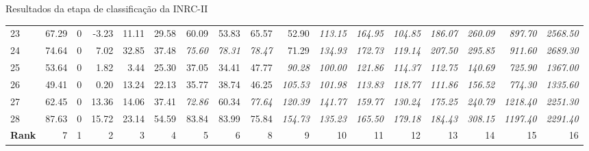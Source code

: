 \documentclass[8pt,mathserif,professionalfont]{beamer}
\begin{document}
\begin{frame}{Resultados da etapa de classificação da INRC-II}
\begin{table}[H]
{\begin{tabular}{lrrrrrrrrrrrrrrrr}
   23 & 67.29 &   0 & -3.23 & 11.11 & 29.58 & 60.09 & 53.83 & 65.57 & 52.90 & \it 113.15 & \it 164.95 & \it 104.85 & \it 186.07 & \it 260.09 & \it 897.70 & \it 2568.50 \\
   24 & 74.64 &   0 & 7.02 & 32.85 & 37.48 & \it 75.60 & \it 78.31 & \it 78.47 & 71.29 & \it 134.93 & \it 172.73 & \it 119.14 & \it 207.50 & \it 295.85 & \it 911.60 & \it 2689.30 \\
   25 & 53.64 &   0 & 1.82 & 3.44 & 25.30 & 37.05 & 34.41 & 47.77 & \it 90.28 & \it 100.00 & \it 121.86 & \it 114.37 & \it 112.75 & \it 140.69 & \it 725.90 & \it 1367.00 \\
   26 & 49.41 &   0 & 0.20 & 13.24 & 22.13 & 35.77 & 38.74 & 46.25 & \it 105.53 & \it 101.98 & \it 113.83 & \it 118.77 & \it 111.86 & \it 156.52 & \it 774.30 & \it 1335.60 \\
   27 & 62.45 &   0 & 13.36 & 14.06 & 37.41 & \it 72.86 & 60.34 & \it 77.64 & \it 120.39 & \it 141.77 & \it 159.77 & \it 130.24 & \it 175.25 & \it 240.79 & \it 1218.40 & \it 2251.30 \\
   28 & 87.63 &   0 & 15.72 & 23.14 & 54.59 & 83.84 & 83.99 & 75.84 & \it 154.73 & \it 135.23 & \it 165.50 & \it 179.18 & \it 184.43 & \it 308.15 & \it 1197.40 & \it 2291.40 \\
\midrule  
 \textbf{Rank} & 7 & 1 & 2 & 3 & 4 & 5 & 6 & 8 & 9 & 10 & 11 & 12 & 13 & 14 & 15 & 16  
\\ 
\bottomrule

\end{tabular}
}
\end{table}


\end{frame}
\end{document}
